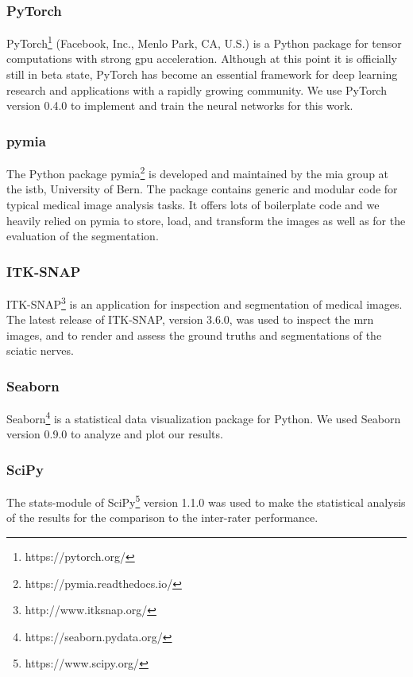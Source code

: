 \subsubsection{PyTorch}
PyTorch\footnote{https://pytorch.org/} (Facebook, Inc., Menlo Park, CA, U.S.) is a Python package for tensor computations with strong \gls{gpu} acceleration. Although at this point it is officially still in beta state, PyTorch has become an essential framework for deep learning research and applications with a rapidly growing community. We use PyTorch version 0.4.0 to implement and train the neural networks for this work.
\subsubsection{pymia}
The Python package pymia\footnote{https://pymia.readthedocs.io/} is developed and maintained by the \gls{mia} group at the \gls{istb}, University of Bern. The package contains generic and modular code for typical medical image analysis tasks. It offers lots of boilerplate code and we heavily relied on pymia to store, load, and transform the images as well as for the evaluation of the segmentation.
\subsubsection{ITK-SNAP}
ITK-SNAP\footnote{http://www.itksnap.org/} \cite{py06nimg} is an application for inspection and segmentation of medical images. The latest release of ITK-SNAP, version 3.6.0, was used to inspect the \gls{mrn} images, and to render and assess the ground truths and segmentations of the sciatic nerves.
\subsubsection{Seaborn}
Seaborn\footnote{https://seaborn.pydata.org/} is a statistical data visualization package for Python. We used Seaborn version 0.9.0 to analyze and plot our results.
\subsubsection{SciPy}
The stats-module of SciPy\footnote{https://www.scipy.org/} version 1.1.0 was used to make the statistical analysis of the results for the comparison to the inter-rater performance.

